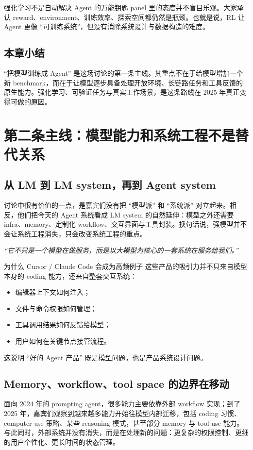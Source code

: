 \documentclass[a4paper]{article}
\begin{document}
\begin{warningbox}{强化学习不是自动解决 Agent 的万能钥匙}
panel 里的态度并不盲目乐观。大家承认 reward、environment、训练效率、探索空间都仍然是瓶颈。也就是说，RL 让 Agent 更像 ``可训练系统''，但没有消除系统设计与数据构造的难度。
\end{warningbox}

\subsection{本章小结}
``把模型训练成 Agent'' 是这场讨论的第一条主线。其重点不在于给模型增加一个新 benchmark，而在于让模型逐步具备处理开放环境、长链路任务和工具反馈的原生能力。强化学习、可验证任务与真实工作场景，是这条路线在 2025 年真正变得可做的原因。

\section{第二条主线：模型能力和系统工程不是替代关系}

\subsection{从 LM 到 LM system，再到 Agent system}
讨论中很有价值的一点，是嘉宾们没有把 ``模型派'' 和 ``系统派'' 对立起来。相反，他们把今天的 Agent 系统看成 LM system 的自然延伸：模型之外还需要 infra、memory、定制化 workflow、交互界面与工具封装。换句话说，强模型并不会让系统工程消失，只会改变系统工程的重点。

\textit{``它不只是一个模型在做服务，而是以大模型为核心的一套系统在服务给我们。''}

\begin{importantbox}{为什么 Cursor / Claude Code 会成为高频例子}
这些产品的吸引力并不只来自模型本身的 coding 能力，还来自整套交互系统：
\begin{itemize}
  \item 编辑器上下文如何注入；
  \item 文件与命令权限如何管理；
  \item 工具调用结果如何反馈给模型；
  \item 用户如何在关键节点接管流程。
\end{itemize}
这说明 ``好的 Agent 产品'' 既是模型问题，也是产品系统设计问题。
\end{importantbox}

\subsection{Memory、workflow、tool space 的边界在移动}
面向 2024 年的 prompting agent，很多能力主要依靠外部 workflow 实现；到了 2025 年，嘉宾们观察到越来越多能力开始往模型内部迁移，包括 coding 习惯、computer use 策略、某些 reasoning 模式，甚至部分 memory 与 tool use 能力。与此同时，外部系统并没有消失，而是在处理新的问题：更复杂的权限控制、更细的用户个性化、更长时间的状态管理。
\end{document}
